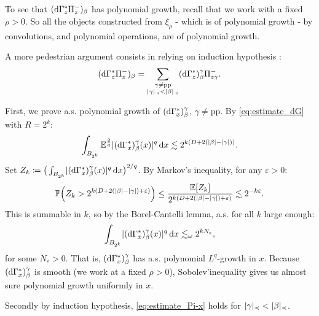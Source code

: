 \begin{remark}
    To see that $(\mathrm{d}\Gamma^*_z \Pi^-_z)_\beta$ has polynomial growth, recall that we work with a fixed $\rho>0$. So all the objects constructed from $\xi_\rho$ - which is of polynomial growth - by convolutions, and polynomial operations, are of polynomial growth.

A more pedestrian argument consists in relying on induction hypothesis :
$$(\mathrm{d}\Gamma^*_z \Pi^-_z)_\beta = \sum_{\substack{\gamma \neq \text{pp} \\ \lvert\gamma\rvert_\prec < \lvert\beta\rvert_\prec}} (\mathrm{d}\Gamma^*_z)^\gamma_\beta \Pi^-_{z\gamma}.$$

First, we prove a.s. polynomial growth of $(\mathrm{d}\Gamma^*_x)^\gamma_\beta$, $\gamma \neq $pp.
By \eqref{eq:estimate_dG} with $R = 2^k$:
\begin{equation*}
    \int_{B_{2^k}} \mathbb{E}^{\frac{2}{q}} \lvert(\mathrm{d}\Gamma^*_x)^\gamma_\beta(x)\rvert^q \,\mathrm{d} x \lesssim 2^{k(D + 2(\lvert\beta\rvert-\lvert\gamma\rvert))}.
\end{equation*}
Set $Z_k \coloneq \big(\int_{B_{2^k}} \lvert(\mathrm{d}\Gamma^*_x)^\gamma_\beta(x)\rvert^q \,\mathrm{d} x\big)^{2/q}$. By Markov's inequality, for any $\varepsilon > 0$:
\begin{equation*}
    \mathbb{P}\!\left(Z_k > 2^{k(D + 2(\lvert\beta\rvert-\lvert\gamma\rvert) + \varepsilon)}\right) \leq \frac{\mathbb{E}[Z_k]}{2^{k(D + 2(\lvert\beta\rvert-\lvert\gamma\rvert) + \varepsilon)}} \lesssim 2^{-k\varepsilon}.
\end{equation*}
This is summable in $k$, so by the Borel-Cantelli lemma, a.s. for all $k$ large enough:
\begin{equation*}
    \int_{B_{2^k}} \lvert(\mathrm{d}\Gamma^*_x)^\gamma_\beta(x)\rvert^q \,\mathrm{d} x \lesssim_\omega 2^{kN_\varepsilon},
\end{equation*}
for some $N_\varepsilon > 0$. That is, $(\mathrm{d}\Gamma^*_x)^\gamma_\beta$ has a.s. polynomial $L^q$-growth in $x$.
Because $(\mathrm{d}\Gamma^*_x)^\gamma_\beta$ is smooth (we work at a fixed $\rho >0$), Sobolev'inequality gives us almost sure polynomial growth uniformly in $x$.

Secondly by induction hypothesis, \eqref{eq:estimate_Pi-x} holds for $\lvert\gamma\rvert_\prec < \lvert\beta\rvert_\prec$.
\end{remark}






